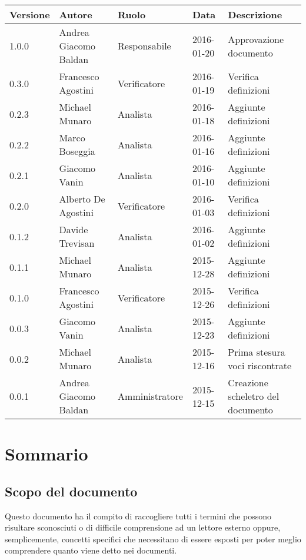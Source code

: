 \documentclass{scalatekids-article}
\begin{document}
\begin{center}
  \begin{tabular}{|l | l | l | l | l |}
    \hline
    Versione & Autore & Ruolo & Data & Descrizione \\
    \hline
    1.0.0 & Andrea Giacomo Baldan & Responsabile & 2016-01-20 & Approvazione documento\\
    \hline
    0.3.0 & Francesco Agostini & Verificatore & 2016-01-19 & Verifica definizioni\\
    \hline
    0.2.3 & Michael Munaro & Analista & 2016-01-18 & Aggiunte definizioni\\
    \hline
    0.2.2 & Marco Boseggia & Analista & 2016-01-16 & Aggiunte definizioni\\
    \hline
    0.2.1 & Giacomo Vanin & Analista & 2016-01-10 & Aggiunte definizioni\\
    \hline
    0.2.0 & Alberto De Agostini & Verificatore & 2016-01-03 & Verifica definizioni\\
    \hline
    0.1.2 & Davide Trevisan & Analista & 2016-01-02 & Aggiunte definizioni\\
    \hline
    0.1.1 & Michael Munaro & Analista & 2015-12-28 & Aggiunte definizioni\\
    \hline
    0.1.0 & Francesco Agostini & Verificatore & 2015-12-26 & Verifica definizioni\\
    \hline
    0.0.3 & Giacomo Vanin & Analista & 2015-12-23 & Aggiunte definizioni\\
    \hline
    0.0.2 & Michael Munaro & Analista & 2015-12-16 & Prima stesura voci riscontrate\\
    \hline
    0.0.1 & Andrea Giacomo Baldan & Amministratore & 2015-12-15 & Creazione scheletro del documento\\
    \hline
  \end{tabular}
\end{center}
\section{Sommario}
\subsection{Scopo del documento}
Questo documento ha il compito di raccogliere tutti i termini che possono risultare sconosciuti o di difficile comprensione ad un lettore esterno oppure, semplicemente, concetti specifici che necessitano di essere esposti per poter meglio comprendere quanto viene detto nei documenti.
\end{document}
